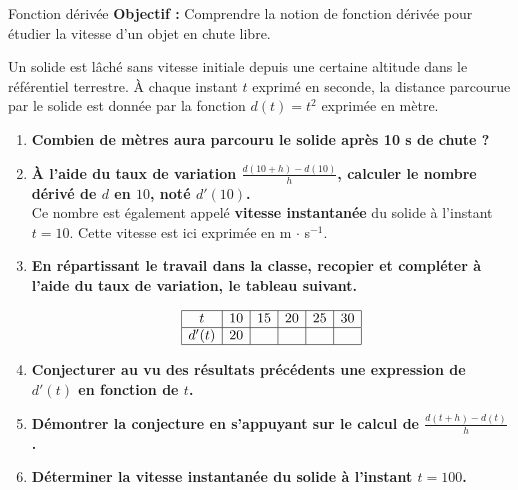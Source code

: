 \documentclass[12pt]{article}
\theoremstyle{break}
\begin{document}
\small


\vfill

\noindent{
\makebox[0pt][l]{\textbf{\Niveau}}%
\makebox[\textwidth][c]{\textbf{\Chapitre}}%
\makebox[0pt][r]{\textbf{\Document}}
}

\begin{activite*}{Fonction dérivée}{}
    \textbf{Objectif :} Comprendre la notion de fonction dérivée pour étudier la vitesse d'un objet en chute libre.
\end{activite*}

\noindent
Un solide est lâché sans vitesse initiale depuis une certaine altitude dans le référentiel terrestre. À chaque instant $t$ exprimé en seconde, la distance parcourue par le solide est donnée par la fonction $d(t) = t^2$ exprimée en mètre.


\begin{enumerate}
    \item \textbf{Combien de mètres aura parcouru le solide après 10 s de chute ?}

    \item \textbf{À l’aide du taux de variation $\frac{d(10 + h) - d(10)}{h}$, calculer le nombre dérivé de $d$ en $10$, noté $d'(10)$.} \\
    Ce nombre est également appelé \textbf{vitesse instantanée} du solide à l’instant $t = 10$. Cette vitesse est ici exprimée en m $\cdot$ s$^{-1}$.

    \item \textbf{En répartissant le travail dans la classe, recopier et compléter à l'aide du taux de variation, le tableau suivant.}

    \[
    \begin{array}{|c|c|c|c|c|c|}
    \hline
    t & 10 & 15 & 20 & 25 & 30 \\
    \hline
    d'(t) & 20 &   &   &   &   \\
    \hline
    \end{array}
    \]

    \item \textbf{Conjecturer au vu des résultats précédents une expression de $d'(t)$ en fonction de $t$.}

    \item \textbf{Démontrer la conjecture en s’appuyant sur le calcul de $\frac{d(t + h) - d(t)}{h}$.}

    \item \textbf{Déterminer la vitesse instantanée du solide à l’instant $t = 100$.}
\end{enumerate}
\end{document}

